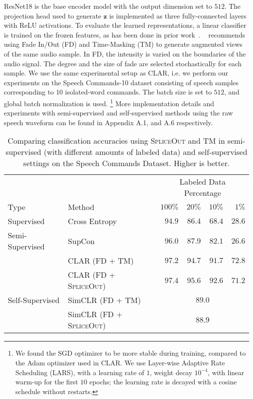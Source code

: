 \documentclass{article}
\newcommand{\SpA}{{\textsc{SpliceOut}}\xspace}
\begin{document}
ResNet18 is the base encoder model with the output dimension set to $512$. The projection head used to generate $\mathbf{z}$ is implemented as three fully-connected layers with ReLU activations. To evaluate the learned representations, a linear classifier is trained on the frozen features, as has been done in prior work~\citep{grill2020bootstrap,chen2020exploring,zbontar2021barlow,chen2020simple}. ~\citep{clar} recommends using Fade In/Out (FD) and Time-Masking (TM) to generate augmented views of the same audio sample. In FD, the intensity is varied on the boundaries of the audio signal. The degree and the size of fade are selected stochastically for each sample. We use the same experimental setup as CLAR, i.e. we perform our experiments on the Speech Commands-10 dataset consisting of speech samples corresponding to $10$ isolated-word commands. The batch size is set to $512$, and global batch normalization is used.%
\footnote{We found the SGD optimizer to be more stable during training, compared to the Adam optimizer used in CLAR. We use Layer-wise Adaptive Rate Scheduling (LARS), with a learning rate of $1$, weight decay $10^{-4}$, with linear warm-up for the first $10$ epochs; the learning rate is decayed with a cosine schedule without restarts.}
%
More implementation details and experiments with semi-supervised and self-supervised methods using the raw speech waveform can be found in Appendix A.1, and A.6 respectively.

\begin{table}[h]
    \centering
    \caption{Comparing classification accuracies using \SpA and TM in semi-supervised (with different amounts of labeled data) and self-supervised settings on the Speech Commands Dataset. Higher is better.}
    \begin{tabular}{ll|rrrr}
    \toprule
         & & \multicolumn{4}{c}{Labeled Data Percentage} \\
         Type & Method & $100\%$ & $20\%$ & $10\%$ & $1\%$\\
         \midrule
         Supervised&Cross Entropy& $94.9$ & $86.4$ & $68.4$ & $28.6$\\
         \midrule
         Semi-Supervised&SupCon & $96.0$ & $87.9$ & $82.1$ & $26.6$\\
         &CLAR (FD + TM)~\citep{clar,specaugment} & $97.2$ & $94.7$ & $91.7$ & $\mathbf{72.8}$\\
         &CLAR (FD + \SpA) & $\mathbf{97.4}$ & $\mathbf{95.6}$ & $\mathbf{92.6}$ & $71.2$\\
         \midrule
         Self-Supervised & SimCLR (FD + TM)~\citep{clar,specaugment} & \multicolumn{4}{c}{$89.0$}\\
         & SimCLR (FD + \SpA) & \multicolumn{4}{c}{$88.9$}\\
    \bottomrule
    \end{tabular}
    \label{tab:clar}
\end{table}
\end{document}
